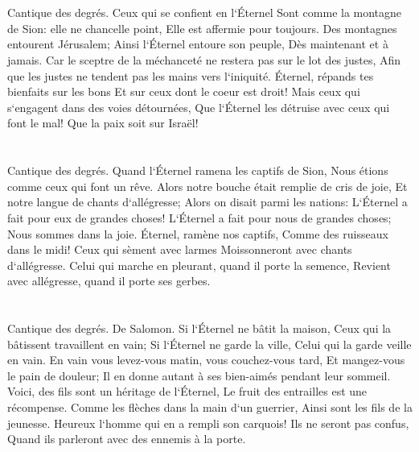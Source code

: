 \chapter{}

\verse Cantique des degrés. Ceux qui se confient en l`Éternel Sont comme la montagne de Sion: elle ne chancelle point, Elle est affermie pour toujours. 
\verse Des montagnes entourent Jérusalem; Ainsi l`Éternel entoure son peuple, Dès maintenant et à jamais. 
\verse Car le sceptre de la méchanceté ne restera pas sur le lot des justes, Afin que les justes ne tendent pas les mains vers l`iniquité. 
\verse Éternel, répands tes bienfaits sur les bons Et sur ceux dont le coeur est droit! 
\verse Mais ceux qui s`engagent dans des voies détournées, Que l`Éternel les détruise avec ceux qui font le mal! Que la paix soit sur Israël! 

\chapter{}

\verse Cantique des degrés. Quand l`Éternel ramena les captifs de Sion, Nous étions comme ceux qui font un rêve. 
\verse Alors notre bouche était remplie de cris de joie, Et notre langue de chants d`allégresse; Alors on disait parmi les nations: L`Éternel a fait pour eux de grandes choses! 
\verse L`Éternel a fait pour nous de grandes choses; Nous sommes dans la joie. 
\verse Éternel, ramène nos captifs, Comme des ruisseaux dans le midi! 
\verse Ceux qui sèment avec larmes Moissonneront avec chants d`allégresse. 
\verse Celui qui marche en pleurant, quand il porte la semence, Revient avec allégresse, quand il porte ses gerbes. 

\chapter{}

\verse Cantique des degrés. De Salomon. Si l`Éternel ne bâtit la maison, Ceux qui la bâtissent travaillent en vain; Si l`Éternel ne garde la ville, Celui qui la garde veille en vain. 
\verse En vain vous levez-vous matin, vous couchez-vous tard, Et mangez-vous le pain de douleur; Il en donne autant à ses bien-aimés pendant leur sommeil. 
\verse Voici, des fils sont un héritage de l`Éternel, Le fruit des entrailles est une récompense. 
\verse Comme les flèches dans la main d`un guerrier, Ainsi sont les fils de la jeunesse. 
\verse Heureux l`homme qui en a rempli son carquois! Ils ne seront pas confus, Quand ils parleront avec des ennemis à la porte. 

